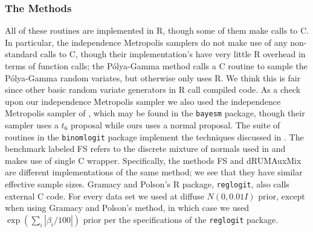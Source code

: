 \documentclass{article}
\newcommand{\Polya}{P\'{o}lya}
\begin{document}
\subsubsection{The Methods}

All of these routines are implemented in R, though some of them make calls to C.
In particular, the independence Metropolis samplers do not make use of any
non-standard calls to C, though their implementation's have very little R
overhead in terms of function calls; the \Polya-Gamma method calls a C routine
to sample the \Polya-Gamma random variates, but otherwise only uses R.  We think
this is fair since other basic random variate generators in R call compiled
code.  As a check upon our independence Metropolis sampler we also used the
independence Metropolis sampler of \cite{rossi-etal-2005}, which may be found in
the \texttt{bayesm} package, though their sampler uses a $t_6$ proposal while
ours uses a normal proposal.  The suite of routines in the \texttt{binomlogit}
package implement the techniques discussed in
\cite{fruhwirth-schnatter-fruhwirth-2010}.  The benchmark labeled FS refers to
the discrete mixture of normals used in
\cite{fruhwirth-schnatter-fruhwirth-2010} and makes use of single C wrapper.
Specifically, the methods FS and dRUMAuxMix are different implementations of the
same method; we see that they have similar effective sample sizes.  Gramacy and
Polson's R package, \texttt{reglogit}, also calls external C code.  For every
data set we used at diffuse $N(0, 0.01 I)$ prior, except when using Gramacy and
Polson's method, in which case we used $\exp(\sum_{i} |\beta_i / 100|)$ prior
per the specifications of the \texttt{reglogit} package.
\end{document}
